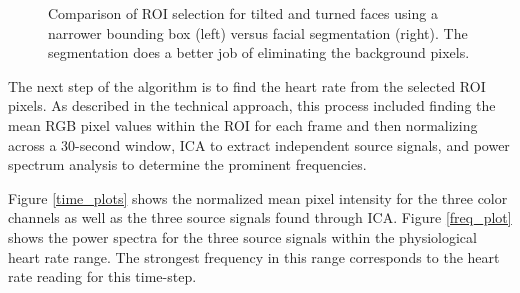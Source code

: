 \documentclass[10pt,twocolumn,letterpaper]{article}
\begin{document}
\begin{figure}
\begin{center}
\end{center}
\caption{Comparison of ROI selection for tilted and turned faces using a narrower bounding box (left) versus facial segmentation (right). The segmentation does a better job of eliminating the background pixels.}
\label{tilt_turn}
\end{figure}

The next step of the algorithm is to find the heart rate from the selected ROI pixels. As described in the technical approach, this process included finding the mean RGB pixel values within the ROI for each frame and then normalizing across a 30-second window, ICA to extract independent source signals, and power spectrum analysis to determine the prominent frequencies.

Figure \ref{time_plots} shows the normalized mean pixel intensity for the three color channels as well as the three source signals found through ICA. Figure \ref{freq_plot} shows the power spectra for the three source signals within the physiological heart rate range. The strongest frequency in this range corresponds to the heart rate reading for this time-step.
\end{document}
